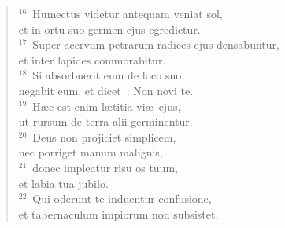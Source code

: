 \begin{flushleft}
\begin{verse}
${}^{16}$~Humectus videtur antequam veniat sol,\\ et in ortu suo germen ejus egredietur.\\
${}^{17}$~Super acervum petrarum radices ejus densabuntur,\\ et inter lapides commorabitur.\\
${}^{18}$~Si absorbuerit eum de loco suo,\\ negabit eum, et dicet~: Non novi te.\\
${}^{19}$~H\ae c est enim l\ae titia vi\ae\ ejus,\\ ut rursum de terra alii germinentur.\\
${}^{20}$~Deus non projiciet simplicem,\\ nec porriget manum malignis,\\
${}^{21}$~donec impleatur risu os tuum,\\ et labia tua jubilo.\\
${}^{22}$~Qui oderunt te induentur confusione,\\ et tabernaculum impiorum non subsistet.\end{verse}\end{flushleft}


